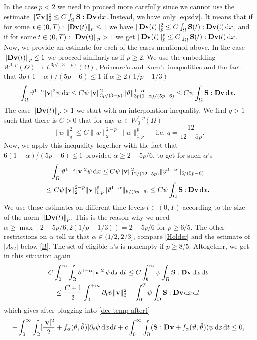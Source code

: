 \documentclass[11pt, a4paper, reqno]{amsart}
\numberwithin{equation}{section}
\newcommand{\dert}{\partial_t}
\newcommand{\thetah}{\hat\thet}
\newcommand{\vc}[1]{{\bf #1}}
\newcommand{\vv}{\vc{v}}
\newcommand{\thet}{\vartheta}
\renewcommand{\S}{\mathbf{S}}
\newcommand{\D}{\mathbf{D}}
\newcommand{\dt}{\,{\rm d} t }
\newcommand{\dx}{\,{\rm d} {x}}
\newcommand{\al}{\alpha}
\newcommand{\intT}[1]{\int_0^T #1  \dt}
\newcommand{\intnn}[1]{\int_0^{\infty} #1  \dt}
\newcommand{\intnO}[1]{\int_0^{\infty}\intO{ #1 }\dt}
\newcommand{\intO}[1]{\int_{\Omega} #1 \dx}
\newcommand{\nm}[1]{\|#1\|}
\begin{document}
In the case $p<2$ we need to proceed more carefully since we cannot use the estimate $\nm{\nabla\vv}_2^2\leq C\intO{\S:\D{\vv}}$. Instead, we have only \eqref{eq:sdv}. It means that if for some $t\in(0,T): \nm{\D\vv(t)}_p\leq1$ we have $\nm{\D\vv(t)}_{p}^2\leq C\intO{\S(t):\D{\vv(t)}}$, and if for some $t\in(0,T): \nm{\D\vv(t)}_p>1$ we get $\nm{\D\vv(t)}_{p}^p\leq C\intO{\S(t):\D{\vv(t)}}$. Now, we provide an estimate for each of the cases mentioned above. In the case $\nm{\D\vv(t)}_p\leq1$ we proceed similarly as if $p\geq 2$. We use the embedding $W^{1,p}(\Omega)\to L^{3p/(3-p)}(\Omega)$, Poincare's and Korn's inequalities and the fact that $3p(1-\alpha)/(5p-6)\leq 1$ if $\alpha\geq2(1/p-1/3)$
\begin{equation}\label{eq:conv-term-fin2}
\intO{\thet^{1-\al}|\vv|^2\psi}\leq C\psi\nm{\vv}_{{3p}/{(3-p)}}^2\nm{\thet}_{3p(1-\alpha)/(5p-6)}^{1-\al}\leq C\psi\intO{\S:\D{\vv}}.
\end{equation}
The case $\nm{\D\vv(t)}_p>1$ we start with an interpolation inequality. We find $q>1$ such that there is $C>0$ that for any $w\in W^{1,p}_0(\Omega)$
$$
\nm{w}_{q}^2\leq C\nm{w}_{2}^{2-p}\nm{w}_{1,p}^p, \quad\mbox{i.e. $q=\frac{12}{12-5p}$}.
$$
Now, we apply this inequality together with the fact that $6(1-\alpha)/(5p-6)\leq 1$ provided $\alpha\geq 2-5p/6$, to get for such $\alpha$'s
\begin{multline*}
\intO{\thet^{1-\al}|\vv|^2\psi}\leq C\psi\nm{\vv}_{12/{(12-5p)}}^2\nm{\thet^{1-\alpha}}_{6/(5p-6)}\\
\leq C\psi\nm{\vv}_{2}^{2-p}\nm{\vv}_{1,p}^p\nm{\thet^{1-\alpha}}_{6/(5p-6)}\leq C\psi\intO{\S:\D{\vv}}.
\end{multline*}
We use these estimates on different time levels $t\in(0,T)$ according to the size of the norm $\nm{\D\vv(t)}_p$. This is the reason why we need $\alpha\geq\max(2-5p/6,2(1/p-1/3))=2-5p/6$ for $p\geq6/5$. The other restrictions on $\alpha$ tell us that $\alpha\in(1/2,2/3]$, compare \eqref{Holder} and the estimate of $|A_{22}|$ below \eqref{B}. The set of eligible $\alpha$'s is nonempty if $p\geq 8/5$. Altogether, we get in this situation again
\begin{multline*}
  C\intnO{\thet^{1-\al}|\vv|^2\,\psi}\leq C\intnn{\psi\intO{\S:\D{\vv}}} \\
  \leq \frac {C+1}2\int_0^{+\infty}{\dert\psi\nm{\vv}_2^2}-\intT{\psi\intO{\S:\D{\vv}}}
\end{multline*}
which gives after plugging into \eqref{dec-temp-after1}
\begin{equation}\label{eq:final-ljap}
\begin{array}{l}\displaystyle\vspace{6pt}
 - \intnO{[\frac{|\vv|^2}{2}+f_\alpha(\thet,\thetah)]\partial_t\psi}
+ c\intnO{ (\S:\D{\vv}+f_{\alpha}(\thet,\thetah))\psi}\leq 0,
\end{array}
\end{equation}
\end{document}
